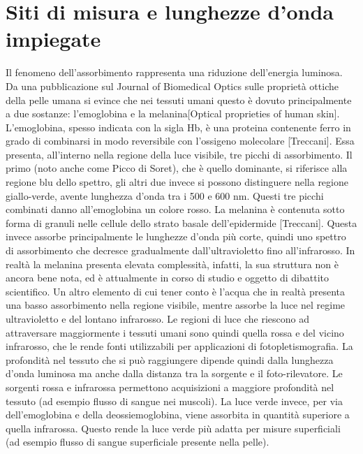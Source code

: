 \section{Siti di misura e lunghezze d'onda impiegate}
Il fenomeno dell'assorbimento rappresenta una riduzione dell'energia luminosa.
Da una pubblicazione sul Journal of Biomedical Optics sulle proprietà ottiche della pelle umana si evince che nei tessuti umani questo è dovuto principalmente a due sostanze: l'emoglobina e la melanina[Optical proprieties of human skin].
L'emoglobina, spesso indicata con la sigla Hb, è una proteina contenente ferro in grado di combinarsi in modo reversibile con l’ossigeno molecolare [Treccani]. Essa presenta, all'interno nella regione della luce visibile, tre picchi di assorbimento. Il primo (noto anche come Picco di Soret), che è quello dominante, si riferisce alla regione blu dello spettro, gli altri due invece si possono distinguere nella regione giallo-verde, avente lunghezza d'onda tra i 500 e 600 nm. Questi tre picchi combinati danno all'emoglobina un colore rosso.
La melanina è contenuta sotto forma di granuli nelle cellule dello strato basale dell’epidermide [Treccani]. Questa invece assorbe principalmente le lunghezze d'onda più corte, quindi uno spettro di assorbimento che decresce gradualmente dall'ultravioletto fino all'infrarosso. In realtà la melanina presenta elevata complessità, infatti, la sua struttura non è ancora bene nota, ed è attualmente in corso di studio e oggetto di dibattito scientifico.
Un altro elemento di cui tener conto è l'acqua che in realtà presenta una basso assorbimento nella regione visibile, mentre assorbe la luce nel regime ultravioletto e del lontano infrarosso. Le regioni di luce che riescono ad attraversare maggiormente i tessuti umani sono quindi quella rossa e del vicino infrarosso, che le rende fonti utilizzabili per applicazioni di fotopletismografia.
La profondità nel tessuto che si può raggiungere dipende quindi dalla lunghezza d'onda luminosa ma anche dalla distanza tra la sorgente e il foto-rilevatore. Le sorgenti rossa e infrarossa permettono acquisizioni a maggiore profondità nel tessuto (ad esempio flusso di sangue nei muscoli). La luce verde invece, per via dell'emoglobina e della deossiemoglobina, viene assorbita in quantità superiore a quella infrarossa. Questo rende la luce verde più adatta per misure superficiali (ad esempio flusso di sangue superficiale presente nella pelle).

 